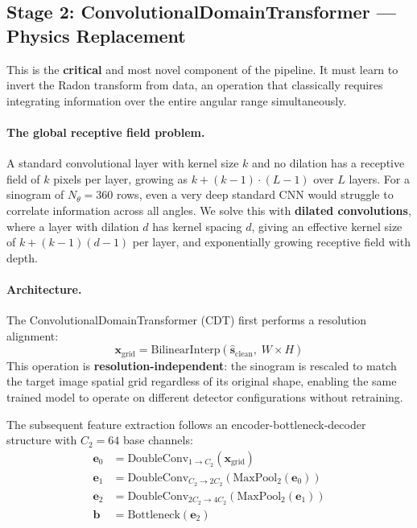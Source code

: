 \documentclass[10pt,twocolumn]{article}
\newcommand{\myvec}[1]{\bm{#1}}
\begin{document}
\subsection{Stage 2: ConvolutionalDomainTransformer --- Physics Replacement}
\label{sec:stage2}

This is the \textbf{critical} and most novel component of the
pipeline.
It must learn to invert the Radon transform from data, an operation
that classically requires integrating information over the entire
angular range simultaneously.

\paragraph{The global receptive field problem.}
A standard convolutional layer with kernel size $k$ and no dilation
has a receptive field of $k$ pixels per layer, growing as $k + (k-1) \cdot (L-1)$
over $L$ layers.
For a sinogram of $N_\theta = 360$ rows, even a very deep standard
CNN would struggle to correlate information across all angles.
We solve this with \textbf{dilated convolutions}, where a layer with
dilation $d$ has kernel spacing $d$, giving an effective kernel
size of $k + (k-1)(d-1)$ per layer, and exponentially growing
receptive field with depth.

\paragraph{Architecture.}
The ConvolutionalDomainTransformer (CDT) first performs a resolution
alignment:
\begin{equation}
    \myvec{x}_{\mathrm{grid}} =
    \mathrm{BilinearInterp}\!\left(\hat{\myvec{s}}_{\mathrm{clean}},\; W \times H\right)
    \label{eq:interp}
\end{equation}
This operation is \textbf{resolution-independent}: the sinogram is
rescaled to match the target image spatial grid regardless of its
original shape, enabling the same trained model to operate on
different detector configurations without retraining.

The subsequent feature extraction follows an encoder-bottleneck-decoder
structure with $C_2 = 64$ base channels:
\begin{align*}
    \myvec{e}_0 &= \mathrm{DoubleConv}_{1 \to C_2}(\myvec{x}_{\mathrm{grid}}) \\
    \myvec{e}_1 &= \mathrm{DoubleConv}_{C_2 \to 2C_2}(\mathrm{MaxPool}_{2}(\myvec{e}_0)) \\
    \myvec{e}_2 &= \mathrm{DoubleConv}_{2C_2 \to 4C_2}(\mathrm{MaxPool}_{2}(\myvec{e}_1)) \\
    \myvec{b} &= \mathrm{Bottleneck}(\myvec{e}_2)
\end{align*}
\end{document}
